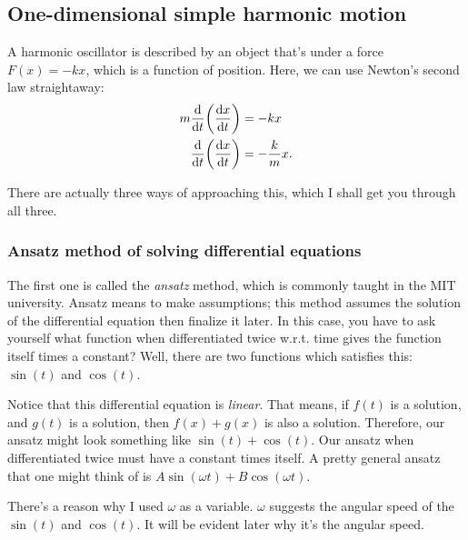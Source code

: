 \subsection{One-dimensional simple harmonic motion}

A harmonic oscillator is described by an object that's under a force $F(x) = -kx$, which is a function of position. Here, we can use Newton's second law straightaway:
\begin{align}
    m\dv{t}(\dv{x}{t}) &= -kx \\
    \dv{t}(\dv{x}{t}) &= -\frac{k}{m}x. \label{eq:simpleharmonicmotion1}
\end{align}

There are actually three ways of approaching this, which I shall get you through all three.

\subsubsection{Ansatz method of solving differential equations}

The first one is called the \emph{ansatz} method, which is commonly taught in the MIT university. Ansatz means to make assumptions; this method assumes the solution of the differential equation then finalize it later. In this case, you have to ask yourself what function when differentiated twice w.r.t. time gives the function itself times a constant? Well, there are two functions which satisfies this: $\sin(t)$ and $\cos(t)$.

Notice that this differential equation is \emph{linear}. That means, if $f(t)$ is a solution, and $g(t)$ is a solution, then $f(x) + g(x)$ is also a solution. Therefore, our ansatz might look something like $\sin(t) + \cos(t)$. Our ansatz when differentiated twice must have a constant times itself. A pretty general ansatz that one might think of is $A\sin(\omega t) + B\cos(\omega t)$.

There's a reason why I used $\omega$ as a variable. $\omega$ suggests the angular speed of the $\sin(t)$ and $\cos(t)$. It will be evident later why it's the angular speed.

